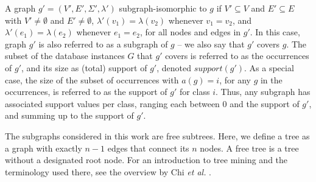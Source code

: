 \documentclass{sig-alternate}
\begin{document}
A graph $g'=(V',E',\Sigma',\lambda')$ subgraph-isomorphic to $g$ if $V'
\subseteq V$ and $E' \subseteq E$ with $V' \ne \emptyset$ and $E' \ne
\emptyset$, $\lambda'(v_1)=\lambda(v_2)$ whenever $v_1=v_2$, and
$\lambda'(e_1)=\lambda(e_2)$ whenever $e_1=e_2$, for all nodes and edges in
$g'$. In this case, graph $g'$ is also referred to as a subgraph of $g$ -- we also say
that $g'$ covers $g$.  The subset of the database instances $G$ that $g'$
covers is referred to as the occurrences of $g'$, and its size as (total) support of
$g'$, denoted $support(g')$.  As a special case, the size of the subset of occurrences with $a(g)=i$,
for any $g$ in the occurrences, is referred to as the support of $g'$ for class
$i$. Thus, any subgraph has associated support values per class, ranging each
between 0 and the support of $g'$, and summing up to the support of $g'$.

The subgraphs considered in this work are free subtrees. Here, we define a tree
as a graph with exactly $n-1$ edges that connect its $n$ nodes. A free tree is
a tree without a designated root node. For an introduction to tree mining and
the terminology used there, see the overview by Chi \emph{et al.}
\cite{CMNK01Frequent}.
\end{document}
